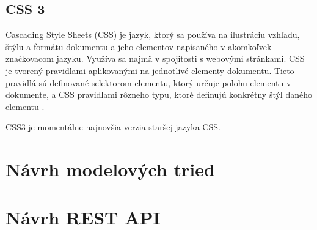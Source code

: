 \subsection{CSS 3}
Cascading Style Sheets (CSS) je jazyk, ktorý sa používa na ilustráciu vzhľadu, štýlu a formátu dokumentu a jeho elementov napísaného v akomkoľvek značkovacom jazyku. Využíva sa najmä v spojitosti s webovými stránkami. CSS je tvorený pravidlami aplikovanými na jednotlivé elementy dokumentu. Tieto pravidlá sú definované selektorom elementu, ktorý určuje polohu elementu v dokumente, a CSS pravidlami rôzneho typu, ktoré definujú konkrétny štýl daného elementu \cite{co-je-css}. 

CSS3 je momentálne najnovšia verzia staršej jazyka CSS.

\section{Návrh modelových tried}




\section{Návrh REST API}